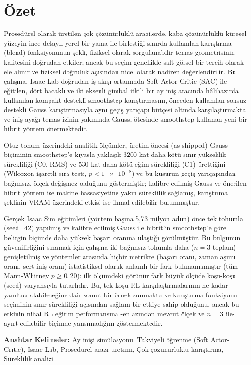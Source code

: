 \section*{Özet}
Prosedürel olarak üretilen çok çözünürlüklü arazilerde, kaba çözünürlüklü
küresel yüzeyin ince detaylı yerel bir yama ile birleştiği sınırda
kullanılan karıştırma (blend) fonksiyonunun şekli, fiziksel olarak
sorgulanabilir temas geometrisinin kalitesini doğrudan etkiler; ancak bu
seçim genellikle salt görsel bir tercih olarak ele alınır ve fiziksel
doğruluk açısından nicel olarak nadiren değerlendirilir. Bu çalışma,
Isaac Lab doğrudan iş akışı ortamında Soft Actor-Critic (SAC) ile
eğitilen, dört bacaklı ve iki eksenli gimbal itkili bir ay iniş aracında
hâlihazırda kullanılan kompakt destekli smoothstep karıştırmasını,
önceden kullanılan sonsuz destekli Gauss karıştırmasıyla aynı geçiş
yarıçapı bütçesi altında karşılaştırmakta ve iniş ayağı temas izinin
yakınında Gauss, ötesinde smoothstep kullanan yeni bir hibrit yöntem
önermektedir.

Otuz tohum üzerindeki analitik ölçümler, üretim öncesi (as-shipped) Gauss
biçiminin smoothstep'e kıyasla yaklaşık 3200 kat daha kötü sınır
yükseklik sürekliliği (C0, RMS) ve 530 kat daha kötü eğim sürekliliği
(C1) ürettiğini (Wilcoxon işaretli sıra testi, $p<\num{1e-8}$) ve bu
kusurun geçiş yarıçapından bağımsız, ölçek değişmez olduğunu
göstermiştir; kalibre edilmiş Gauss ve önerilen hibrit yöntem ise makine
hassasiyetine yakın süreklilik sağlamış, karıştırma şeklinin VRAM
üzerindeki etkisi ise ihmal edilebilir bulunmuştur.

Gerçek Isaac Sim eğitimleri (yöntem başına 5,73 milyon adım) önce tek
tohumla (seed=42) yapılmış ve kalibre edilmiş Gauss ile hibrit'in
smoothstep'e göre belirgin biçimde daha yüksek başarı oranına ulaştığı
görülmüştür. Bu bulgunun güvenilirliğini sınamak için çalışma iki
bağımsız tohumla daha ($n=3$ toplam) genişletilmiş ve yöntemler arasında
hiçbir metrikte (başarı oranı, zaman aşımı oranı, sert iniş oranı)
istatistiksel olarak anlamlı bir fark bulunamamıştır (tüm Mann-Whitney
$p\ge 0{,}20$); ilk ölçümdeki görünür fark büyük ölçüde koşu-koşu (seed)
varyansıyla tutarlıdır. Bu, tek-koşu RL karşılaştırmalarının ne kadar
yanıltıcı olabileceğine dair somut bir örnek sunmakta ve karıştırma
fonksiyonu seçiminin sınır sürekliliği açısından sağlam bir etkiye sahip
olduğunu, ancak bu etkinin nihai RL eğitim performansına -en azından
mevcut ölçek ve $n=3$ ile- ayırt edilebilir biçimde yansımadığını
göstermektedir.

\medskip
\noindent\textbf{Anahtar Kelimeler:} Ay inişi simülasyonu, Takviyeli
öğrenme (Soft Actor-Critic), Isaac Lab, Prosedürel arazi üretimi, Çok
çözünürlüklü karıştırma, Süreklilik analizi

